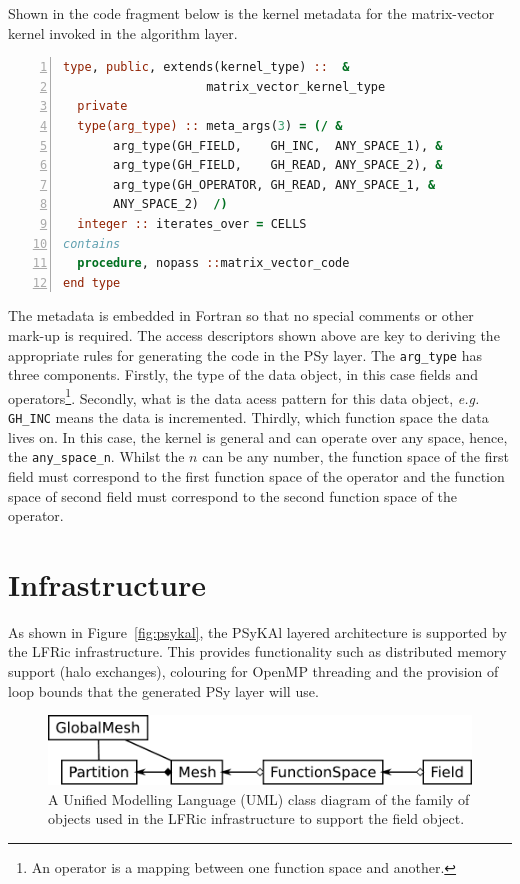 \documentclass[review,times]{elsarticle}
\begin{document}
Shown in the code fragment below is the kernel metadata for the
matrix-vector kernel invoked in the algorithm layer.
\begin{lstlisting}[language=Fortran, numbers=left,caption={Code
fragment showing kernel metadata for the matrix-vector operator kernel},label={lst:metadata}]
type, public, extends(kernel_type) ::  &
                    matrix_vector_kernel_type
  private
  type(arg_type) :: meta_args(3) = (/ &
       arg_type(GH_FIELD,    GH_INC,  ANY_SPACE_1), &
       arg_type(GH_FIELD,    GH_READ, ANY_SPACE_2), &
       arg_type(GH_OPERATOR, GH_READ, ANY_SPACE_1, &
       ANY_SPACE_2)  /)
  integer :: iterates_over = CELLS
contains
  procedure, nopass ::matrix_vector_code
end type
\end{lstlisting}
The metadata is embedded in Fortran so that no special comments or
other mark-up is required. The access descriptors shown above are key
to deriving the appropriate rules for generating the code in the PSy
layer. The \verb+arg_type+ has three components. Firstly, the type of
the data object, in this case fields and operators\footnote{An
  operator is a mapping between one function space and another.}. Secondly, what is
the data acess pattern for this data object, {\em e.g.} \verb+GH_INC+ means the data is
incremented. Thirdly, which function space the data lives on. In this case, the
kernel is general and can operate over any space, hence, the
\verb+any_space_n+. Whilst the $n$ can be any number, the function space of the
first field must correspond to the first function space of the operator and the
function space of second field must correspond to the second function
space of the operator. 


\section{\label{sec:lib}Infrastructure}

As shown in Figure~\ref{fig:psykal}, the PSyKAl layered
architecture is supported by the LFRic infrastructure. This provides
functionality such as distributed memory support (halo exchanges),
colouring for OpenMP threading and the provision of loop bounds that the
generated PSy layer will use.

\begin{figure}
\centering\includegraphics[width=0.8\linewidth]{FieldClass.pdf}
\caption{\label{fig:objects} A Unified Modelling Language (UML) 
class diagram of the family of objects used
in the LFRic infrastructure to support the field object.}
\end{figure}
\end{document}
